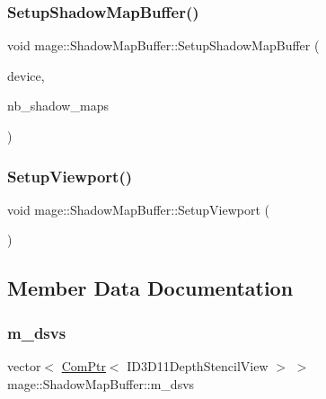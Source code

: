 \subsubsection{\texorpdfstring{Setup\+Shadow\+Map\+Buffer()}{SetupShadowMapBuffer()}}
{\footnotesize\ttfamily void mage\+::\+Shadow\+Map\+Buffer\+::\+Setup\+Shadow\+Map\+Buffer (\begin{DoxyParamCaption}\item[{I\+D3\+D11\+Device5 $\ast$}]{device,  }\item[{size\+\_\+t}]{nb\+\_\+shadow\+\_\+maps }\end{DoxyParamCaption})\hspace{0.3cm}{\ttfamily [private]}}

\hypertarget{structmage_1_1_shadow_map_buffer_aacabad92fb9c0bf81cf2f3c1fbae9f13}{}\label{structmage_1_1_shadow_map_buffer_aacabad92fb9c0bf81cf2f3c1fbae9f13} 
\subsubsection{\texorpdfstring{Setup\+Viewport()}{SetupViewport()}}
{\footnotesize\ttfamily void mage\+::\+Shadow\+Map\+Buffer\+::\+Setup\+Viewport (\begin{DoxyParamCaption}{ }\end{DoxyParamCaption})\hspace{0.3cm}{\ttfamily [private]}}



\subsection{Member Data Documentation}
\hypertarget{structmage_1_1_shadow_map_buffer_acea16328aa086a093ad3f2ef54eb5f4a}{}\label{structmage_1_1_shadow_map_buffer_acea16328aa086a093ad3f2ef54eb5f4a} 
\subsubsection{\texorpdfstring{m\+\_\+dsvs}{m\_dsvs}}
{\footnotesize\ttfamily vector$<$ \hyperlink{namespacemage_ae74f374780900893caa5555d1031fd79}{Com\+Ptr}$<$ I\+D3\+D11\+Depth\+Stencil\+View $>$ $>$ mage\+::\+Shadow\+Map\+Buffer\+::m\+\_\+dsvs\hspace{0.3cm}{\ttfamily [private]}}

